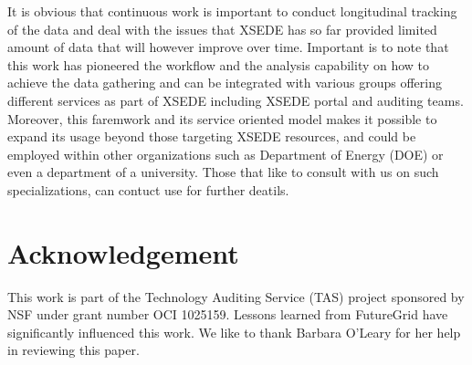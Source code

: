 \documentclass{tex/sig-alternate}
\begin{document}
It is obvious that continuous work is important to conduct longitudinal tracking of the data and deal with the issues that XSEDE has so far provided limited amount of data that will however improve over time. Important is to note that this work has pioneered the workflow and the analysis capability on how to achieve the data gathering and can be integrated with various groups offering different services as part of XSEDE including 
XSEDE portal and auditing teams. Moreover, this faremwork and its service oriented model makes it possible to expand its usage beyond those targeting XSEDE resources, and could be employed within other organizations such as Department of Energy (DOE) or even a department of a university. Those that like to consult with us on such specializations, can contuct use for further deatils. 

 
 
\section*{Acknowledgement} 
 
This work is part of the Technology Auditing Service (TAS) project sponsored by NSF under grant number OCI 1025159. Lessons learned from FutureGrid have significantly influenced this work. We like to thank Barbara O'Leary for her help in reviewing this paper.
 
 
%

% 
 
 
\end{document}
